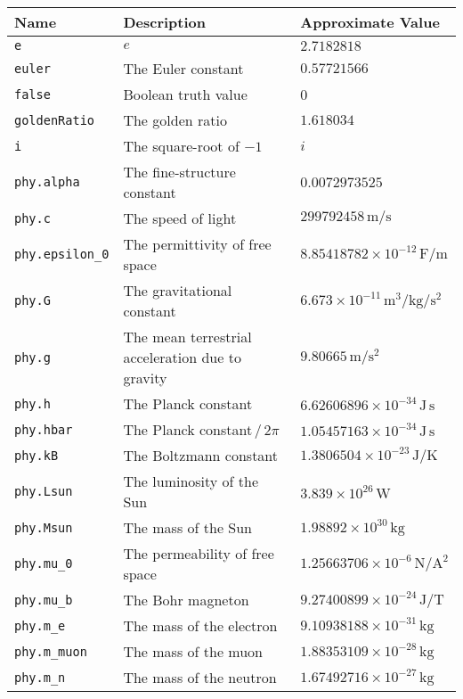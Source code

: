 \begin{landscape}
\begin{center}
\begin{longtable}{|lll|}
\hline \endfoot
\hline
{\bf Name} & {\bf Description} & {\bf Approximate Value} \\ \hline \endhead
{\tt e} & $e$ & $2.7182818$ \\
{\tt euler} & The Euler constant & $0.57721566$ \\
{\tt false} & Boolean truth value & 0 \\
{\tt goldenRatio} & The golden ratio & $1.618034$ \\
{\tt i} & The square-root of $-1$ & $i$ \\
{\tt phy.alpha} & The fine-structure constant & $0.0072973525$ \\
{\tt phy.c} & The speed of light & $299792458\,\mathrm{m}/\mathrm{s}$ \\
{\tt phy.epsilon\_0} & The permittivity of free space & $8.85418782\times10^{-12}\,\mathrm{F}/\mathrm{m}$ \\
{\tt phy.G} & The gravitational constant & $6.673\times10^{-11}\,\mathrm{m}^3/\mathrm{kg}/\mathrm{s}^{2}$ \\
{\tt phy.g} & The mean terrestrial acceleration due to gravity & $9.80665\,\mathrm{m}/\mathrm{s}^{2}$ \\
{\tt phy.h} & The Planck constant & $6.62606896\times10^{-34}\,\mathrm{J}\,\mathrm{s}$ \\
{\tt phy.hbar} & The Planck constant$\,/\,2\pi$ & $1.05457163\times10^{-34}\,\mathrm{J}\,\mathrm{s}$ \\
{\tt phy.kB} & The Boltzmann constant & $1.3806504\times10^{-23}\,\mathrm{J}/\mathrm{K}$ \\
{\tt phy.Lsun} & The luminosity of the Sun & $3.839\times10^{26}\,\mathrm{W}$ \\
{\tt phy.Msun} & The mass of the Sun & $1.98892\times10^{30}\,\mathrm{kg}$ \\
{\tt phy.mu\_0} & The permeability of free space & $1.25663706\times10^{-6}\,\mathrm{N}/\mathrm{A}^{2}$ \\
{\tt phy.mu\_b} & The Bohr magneton & $9.27400899\times10^{-24}\,\mathrm{J}/\mathrm{T}$ \\
{\tt phy.m\_e} & The mass of the electron & $9.10938188\times10^{-31}\,\mathrm{kg}$ \\
{\tt phy.m\_muon} & The mass of the muon & $1.88353109\times10^{-28}\,\mathrm{kg}$ \\
{\tt phy.m\_n} & The mass of the neutron & $1.67492716\times10^{-27}\,\mathrm{kg}$ \\

\end{longtable}
\end{center}
\end{landscape}
